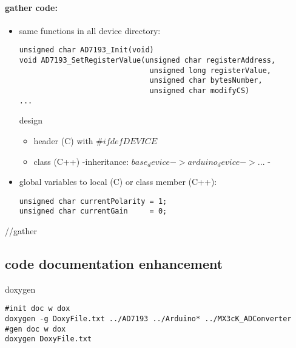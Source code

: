 \documentclass[10pt,a4paper]{report}
\begin{document}
\paragraph*{gather code:}
\begin{itemize}
\item same functions in all device directory:
\begin{lstlisting}
unsigned char AD7193_Init(void)
void AD7193_SetRegisterValue(unsigned char registerAddress,
                              unsigned long registerValue,
                              unsigned char bytesNumber,
                              unsigned char modifyCS)
...
\end{lstlisting}
design
\begin{itemize}
\item header (C) with $\#ifdef DEVICE$
\item class (C++) -inheritance: $base_device->arduino_device->...$ -
\end{itemize}

\item global variables to local (C) or class member (C++):
\begin{lstlisting}
unsigned char currentPolarity = 1;
unsigned char currentGain     = 0;
\end{lstlisting}

\end{itemize}//gather

\subsection{code documentation enhancement}
doxygen
\begin{lstlisting}
#init doc w dox
doxygen -g DoxyFile.txt ../AD7193 ../Arduino* ../MX3cK_ADConverter
#gen doc w dox
doxygen DoxyFile.txt
\end{lstlisting}
\end{document}
